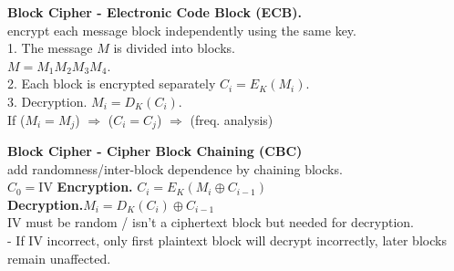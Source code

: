\documentclass[9pt, a4paper]{extarticle}
\let\oldwarning\warning
\renewcommand{\warning}{\raisebox{0.3ex}{\oldwarning}}
\begin{document}
\begin{minipage}[t]{0.495\textwidth}
	\begin{minipage}[t]{0.45\textwidth}
		\textbf{Block Cipher - Electronic Code Block (ECB).}\\ encrypt each message block independently using the same key.\\
		1. The message $M$ is divided into blocks.\\$M = M_1 M_2 M_3 M_4$.\\
			2. Each block is encrypted separately $C_i = E_K(M_i)$.\\
			3. Decryption. $M_i = D_K(C_i)$.\\
			\warning If ($M_i = M_j$) $\Rightarrow$ ($C_i = C_j$) $\Rightarrow$ (freq. analysis)
	\end{minipage}\hfill
	\begin{minipage}[t]{0.53\textwidth}
		\textbf{Block Cipher - Cipher Block Chaining (CBC)} \\
		add randomness/inter-block dependence by chaining blocks.\\
		$C_0 = \text{IV}$ \quad	\textbf{Encryption.} $ C_i = E_K(M_i \oplus C_{i-1})$\\
		\textbf{Decryption.}$M_i = D_K(C_i) \oplus C_{i-1}$\\
		IV must be random / isn't a ciphertext block but needed for decryption.\\
		- If IV incorrect, only first plaintext block will decrypt incorrectly, later blocks remain unaffected.
	\end{minipage}
\end{minipage}
\hfill
\end{document}
